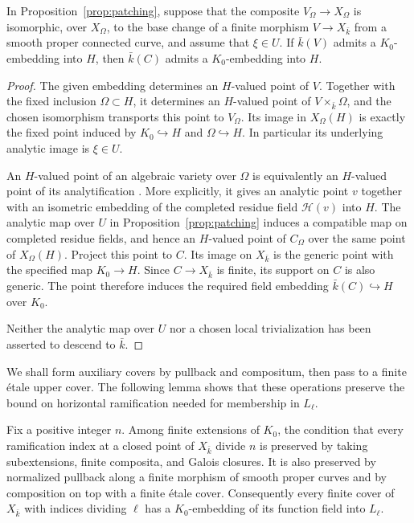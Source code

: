 \begin{lemma}\label{lem:point-transfer}
In Proposition~\ref{prop:patching}, suppose that the composite
$V_\Omega\to X_\Omega$ is isomorphic, over $X_\Omega$, to the base
change of a finite morphism $V\to X_{\bar k}$ from a smooth proper
connected curve, and assume that $\xi\in U$.
If $\bar k(V)$ admits a $K_0$-embedding into $H$, then
$\bar k(C)$ admits a $K_0$-embedding into $H$.
\end{lemma}

\begin{proof}
The given embedding determines an $H$-valued point of $V$.  Together
with the fixed inclusion $\Omega\subset H$, it determines an
$H$-valued point of $V\times_{\bar k}\Omega$, and the chosen
isomorphism transports this point to $V_\Omega$.  Its image in
$X_\Omega(H)$ is exactly the fixed point induced by $K_0\hookrightarrow
H$ and $\Omega\hookrightarrow H$.  In particular its underlying
analytic image is $\xi\in U$.

An $H$-valued point of an algebraic variety over $\Omega$ is equivalently
an $H$-valued point of its analytification \cite[Fact~5.1.3]{TemkinAnalytic}.
More explicitly, it gives an
analytic point $v$ together with an isometric embedding of the completed
residue field $\mathcal H(v)$ into $H$.  The analytic map over $U$ in
Proposition~\ref{prop:patching} induces a compatible map on completed
residue fields, and hence an $H$-valued point of $C_\Omega$ over the
same point of $X_\Omega(H)$.  Project this point to $C$.  Its image on
$X_{\bar k}$ is the generic point with the specified map $K_0\to H$.
Since $C\to X_{\bar k}$ is finite, its support on $C$ is also generic.
The point therefore induces the required field embedding
$\bar k(C)\hookrightarrow H$ over $K_0$.

Neither the analytic map over $U$ nor a chosen local trivialization has
been asserted to descend to $\bar k$.
\end{proof}

We shall form auxiliary covers by pullback and compositum, then pass to
a finite étale upper cover.  The following lemma shows that these
operations preserve the bound on horizontal ramification needed for
membership in $L_\ell$.

\begin{lemma}\label{lem:horizontal-closure}
Fix a positive integer $n$.  Among finite extensions of $K_0$, the
condition that every ramification index at a closed point of
$X_{\bar k}$ divide $n$ is preserved by taking subextensions, finite
composita, and Galois closures.  It is also preserved by normalized
pullback along a finite morphism of smooth proper curves and by
composition on top with a finite étale cover.
Consequently every finite cover of $X_{\bar k}$ with indices dividing
$\ell$ has a $K_0$-embedding of its function field into $L_\ell$.
\end{lemma}


